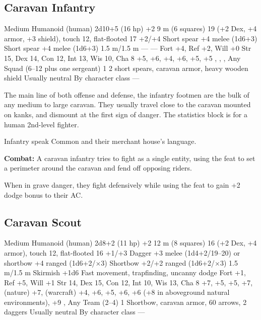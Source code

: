 \subsection{Caravan Infantry}
\begin{MonsterStats}
{Medium Humanoid (human)}
{2d10+5 (16 hp)}
{+2}
{9 m (6 squares)}
{19 (+2 Dex, +4 armor, +3 shield), touch 12, flat-flooted 17}
{+2/+4}
{Short spear +4 melee (1d6+3)}
{Short spear +4 melee (1d6+3)}
{1.5 m/1.5 m}
{---}
{---}
{Fort +4, Ref +2, Will +0}
{Str 15, Dex 14, Con 12, Int 13, Wis 10, Cha 8}
{
	 +5,
	 +6,
	 +4,
	 +6,
	 +5,
	 +5
}
{
	,
	,
	,
}
{Any}
{Squad (6--12 plus one sergeant)}
{1}
{2 short spears, caravan armor, heavy wooden shield}
{Usually neutral}
{By character class}
{---}
\end{MonsterStats}

The main line of both offense and defense, the infantry footmen are the bulk of any medium to large caravan. They usually travel close to the caravan mounted on kanks, and dismount at the first sign of danger. The statistics block is for a human 2nd-level fighter.

Infantry speak Common and their merchant house's language.

\textbf{Combat:} A caravan infantry tries to fight as a single entity, using the  feat to set a perimeter around the caravan and fend off opposing riders.

When in grave danger, they fight defensively while using the  feat to gain +2 dodge bonus to their AC.

\subsection{Caravan Scout}
\begin{MonsterStats}
{Medium Humanoid (human)}
{2d8+2 (11 hp)}
{+2}
{12 m (8 squares)}
{16 (+2 Dex, +4 armor), touch 12, flat-flooted 16}
{+1/+3}
{Dagger +3 melee (1d4+2/19--20) or shortbow +4 ranged (1d6+2/$\times$3)}
{Shortbow +2/+2 ranged (1d6+2/$\times$3)}
{1.5 m/1.5 m}
{Skirmish +1d6}
{Fast movement, trapfinding, uncanny dodge}
{Fort +1, Ref +5, Will +1}
{Str 14, Dex 15, Con 12, Int 10, Wis 13, Cha 8}
{
	 +7,
	 +5,
	 +5,
	 +7,
	 (nature) +7,
	 (warcraft) +4,
	 +6,
	 +5,
	 +6,
	 +6 (+8 in aboveground natural environments),
	 +9
}
{
	,
}
{Any}
{Team (2--4)}
{1}
{Shortbow, caravan armor, 60 arrows, 2 daggers}
{Usually neutral}
{By character class}
{---}
\end{MonsterStats}

